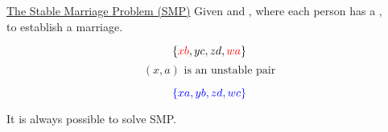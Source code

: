 
\begin{frame}
  \begin{exampleblock}{
      \href{https://youtu.be/Qcv1IqHWAzg}{The Stable Marriage Problem (SMP)}}
    Given  and ,
    where each person has a , \\
    to establish a  marriage.
  \end{exampleblock}

  \vspace{0.30cm}

  \pause
  \[
    \{\textcolor{red}{xb}, yc, zd, \textcolor{red}{wa}\}
  \]
  \[
    (x, a) \text{ is an unstable pair}
  \]
\end{frame}

\begin{frame}{}
  \[
    \textcolor{blue}{\{xa, yb, zd, wc\}}
  \]


  \begin{theorem}
    It is always possible to solve SMP.
  \end{theorem}
\end{frame}
